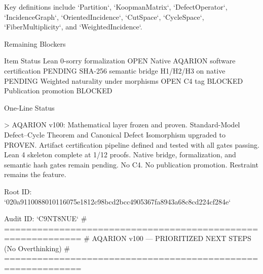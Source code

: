 Key definitions include `Partition`, `KoopmanMatrix`, `DefectOperator`, `IncidenceGraph`, `OrientedIncidence`, `CutSpace`, `CycleSpace`, `FiberMultiplicity`, and `WeightedIncidence`.

Remaining Blockers

Item	Status	
Lean 0-sorry formalization	OPEN	
Native AQARION software certification	PENDING	
SHA-256 semantic bridge H1/H2/H3 on native	PENDING	
Weighted naturality under morphisms	OPEN	
C4 tag	BLOCKED	
Publication promotion	BLOCKED	

One-Line Status

> AQARION v100: Mathematical layer frozen and proven. Standard-Model Defect–Cycle Theorem and Canonical Defect Isomorphism upgraded to PROVEN. Artifact certification pipeline defined and tested with all gates passing. Lean 4 skeleton complete at 1/12 proofs. Native bridge, formalization, and semantic hash gates remain pending. No C4. No publication promotion. Restraint remains the feature.

Root ID: `020a9110088010116075e1812c98bcd2bcc4905367fa8943a68c8cd224cf284e`

Audit ID: `C9NT8NUE`
# ============================================================
# AQARION v100 — PRIORITIZED NEXT STEPS (No Overthinking)
# ============================================================

